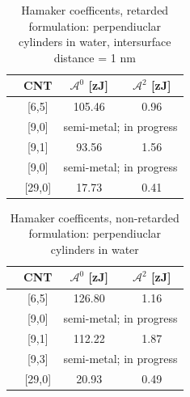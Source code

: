\documentclass[onecolumn,letterpaper,amsmath,amssymb,floatfix,aps,superscriptaddress]{revtex4}
\begin{document}
\begin{table}[ht]
\caption{Hamaker coefficents, retarded formulation: perpendiuclar cylinders
in water, intersurface distance = 1 nm}%
\centering
\begin{tabular}{l c|c|c}
  \hline  
  &\hspace{0.25in}CNT \hspace{0.25in}& \hspace{0.25in}$\mathcal{A}^{0}$    [zJ] \hspace{0.25in}& \hspace{0.25in}$\mathcal{A}^{2}$    [zJ] \hspace{0.25in}\\
  \hline\hline 
  &[6,5]  & 105.46 & 0.96 \\
  \hline
  &[9,0]  & \multicolumn{2}{c}{semi-metal; in progress}\\
  \hline
  &[9,1]  & 93.56 & 1.56 \\
  \hline
  &[9,0]  & \multicolumn{2}{c}{semi-metal; in progress}\\
  \hline
  &[29,0] & 17.73 & 0.41 \\
  \hline  
\end{tabular}
\label{table:nonlin}

\end{table}

\begin{table}[ht]
\caption{Hamaker coefficents, non-retarded formulation: perpendiuclar cylinders in water}%
\centering
\begin{tabular}{r c | c | c}
  \hline
  &\hspace{0.25in}CNT \hspace{0.25in}& \hspace{0.25in}$\mathcal{A}^{0}$    [zJ] \hspace{0.25in}& \hspace{0.25in}$\mathcal{A}^{2}$    [zJ] \hspace{0.25in}\\
  \hline\hline                       
  &[6,5]  & 126.80 & 1.16 \\
  \hline
  &[9,0]  & \multicolumn{2}{c}{semi-metal; in progress}\\
  \hline
  &[9,1]  & 112.22 & 1.87 \\
  \hline
  &[9,3]  & \multicolumn{2}{c}{semi-metal; in progress}\\
  \hline
  &[29,0] & 20.93 & 0.49 \\
  \hline  
\end{tabular}
\label{table:nonlin}

\end{table}
\end{document}
